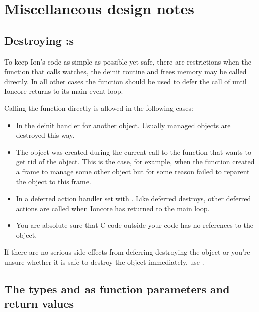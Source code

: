 \section{Miscellaneous design notes}

\subsection{Destroying :s}

To keep Ion's code as simple as possible yet safe, there are restrictions
when the 
function that calls watches, the deinit routine and frees memory may
be called directly. In all other cases the %
function should be used to defer the call of  until
Ioncore returns to its main event loop. 

Calling the  function directly is allowed in the
following cases:
\begin{itemize}
    \item In the deinit handler for another object. Usually managed objects
      are destroyed this way.
    \item The object was created during the current call to the function
      that wants to get rid of the object. This is the case, for example,
      when the function created a frame to manage some other object but for
      some reason failed to reparent the object to this frame.
    \item In a deferred action handler set with %
      .
      Like deferred destroys, other deferred actions are called when
      Ioncore has returned to the main loop.
    \item You are absolute sure that C code outside your code has no
      references to the object.
\end{itemize}

If there are no serious side effects from deferring destroying the
object or you're unsure whether it is safe to destroy the object
immediately, use .

\subsection{The types  and  as function
  parameters and return values}


